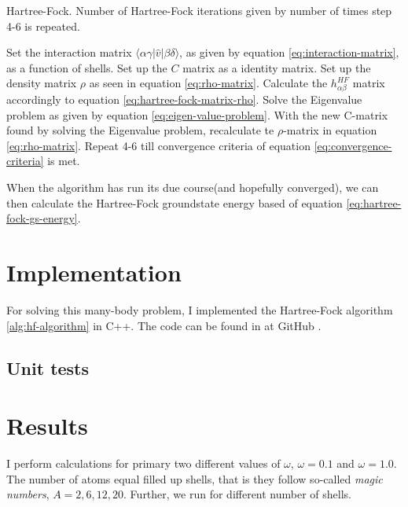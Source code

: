 \documentclass[11pt]{article}
\newcommand{\husk}[1]{\color{red} #1 \color{black}}
\begin{document}
\begin{algorithm}[H]
\caption{Hartree-Fock. Number of Hartree-Fock iterations given by number of times step 4-6 is repeated.}
\label{alg:hf-algorithm}
\begin{algorithmic}[1]
\State Set the interaction matrix $\langle \alpha \gamma |\hat{v}| \beta \delta \rangle$, as given by equation \eqref{eq:interaction-matrix}, as a function of shells.
\State Set up the $C$ matrix as a identity matrix.
\State Set up the density matrix $\rho$ as seen in equation \eqref{eq:rho-matrix}.
\State Calculate the $h^{HF}_{\alpha\beta}$ matrix accordingly to equation \eqref{eq:hartree-fock-matrix-rho}.
\State Solve the Eigenvalue problem as given by equation \eqref{eq:eigen-value-problem}.
\State With the new C-matrix found by solving the Eigenvalue problem, recalculate te $\rho$-matrix in equation \eqref{eq:rho-matrix}.
\State Repeat 4-6 till convergence criteria of equation \eqref{eq:convergence-criteria} is met.
\end{algorithmic}
\end{algorithm}

When the algorithm has run its due course(and hopefully converged), we can then calculate the Hartree-Fock groundstate energy based of equation \eqref{eq:hartree-fock-gs-energy}.

\section{Implementation}
For solving this many-body problem, I implemented the Hartree-Fock algorithm \ref{alg:hf-algorithm} in C++. The code can be found in at \husk{GitHub}.

\subsection{Unit tests}

\section{Results}
I perform calculations for primary two different values of $\omega$, $\omega=0.1$ and $\omega=1.0$. The number of atoms equal filled up shells, that is they follow so-called \textit{magic numbers}, $A = 2, 6, 12, 20$. Further, we run for different number of shells.
\end{document}
